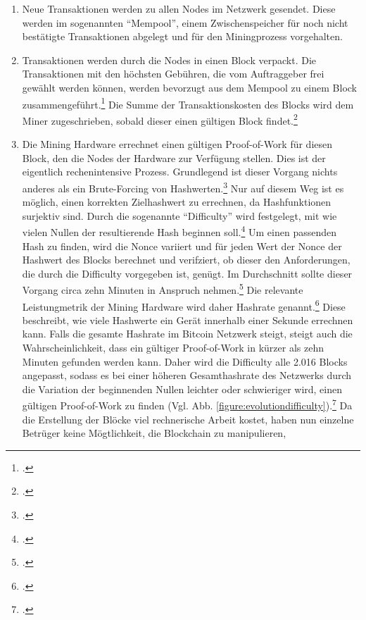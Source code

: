\begin{enumerate}
    \item Neue Transaktionen werden zu allen Nodes im Netzwerk gesendet. Diese werden im sogenannten "`Mempool"',
    einem Zwischenspeicher für noch nicht bestätigte Transaktionen abgelegt und für den Miningprozess vorgehalten.
    \item Transaktionen werden durch die Nodes in einen Block verpackt. Die Transaktionen mit den höchsten Gebühren,
    die vom Auftraggeber frei gewählt werden können, werden bevorzugt aus dem Mempool zu einem Block
    zusammengeführt.\footcite[Vgl.][S. 53]{bhaskar2015bitcoin} Die Summe der Transaktionskosten des Blocks wird dem Miner
    zugeschrieben, sobald dieser einen gültigen Block findet.\footcite[Vgl.][S. 4]{nakamoto2008bitcoin}
    \item Die Mining Hardware errechnet einen gültigen Proof-of-Work für diesen Block, den die Nodes der Hardware zur
    Verfügung stellen. Dies ist der eigentlich rechenintensive Prozess. Grundlegend ist dieser Vorgang nichts
    anderes als ein Brute-Forcing von Hashwerten.\footcite[Vgl.][S. 747]{mukhopadhyay2016brief} Nur auf diesem Weg ist
    es möglich, einen korrekten Zielhashwert zu errechnen, da Hashfunktionen surjektiv sind. Durch die sogenannte
    "`Difficulty"' wird festgelegt, mit wie vielen Nullen der resultierende Hash beginnen
    soll.\footcite[Vgl.][S. 57]{bhaskar2015bitcoin} Um einen passenden Hash zu finden, wird die Nonce variiert und
    für jeden Wert der Nonce der Hashwert des Blocks berechnet und verifziert, ob dieser den Anforderungen, die
    durch die Difficulty vorgegeben ist, genügt. Im Durchschnitt sollte dieser Vorgang circa zehn Minuten in Anspruch
    nehmen.\footcite[Vgl.][S. 748]{mukhopadhyay2016brief} Die relevante Leistungmetrik der Mining Hardware wird daher
    Hashrate genannt.\footcite[Vgl.][S. 49]{bhaskar2015bitcoin} Diese beschreibt, wie viele Hashwerte ein Gerät innerhalb
    einer Sekunde errechnen kann. Falls die gesamte Hashrate im Bitcoin Netzwerk steigt, steigt auch die
    Wahrscheinlichkeit, dass ein gültiger Proof-of-Work in kürzer als zehn Minuten gefunden werden kann. Daher wird die
    Difficulty alle 2.016 Blocks angepasst, sodass es bei einer höheren Gesamthashrate des Netzwerks durch die Variation
    der beginnenden Nullen leichter oder schwieriger wird, einen gültigen Proof-of-Work zu finden (Vgl.
    Abb. \ref{figure:evolutiondifficulty}).\footcite[Vgl.][S. 57]{bhaskar2015bitcoin} Da die Erstellung der Blöcke
    viel rechnerische Arbeit kostet, haben nun einzelne Betrüger keine Mögtlichkeit, die Blockchain zu manipulieren,

\end{enumerate}
